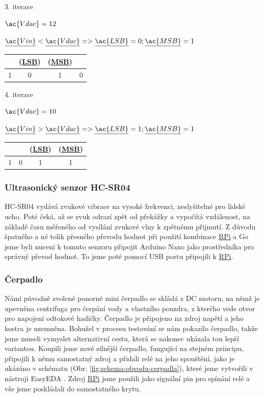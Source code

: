 \documentclass[czech,12pt,a4paper]{article}
\begin{document}
3. iterace

	$\ac{Vdac} = 12$

	$\underline{\ac{Vin}} < \underline{\ac{Vdac}} => \underline{\ac{LSB}} = 0; \underline{\ac{MSB}} = 1$

\begin{center}
	\begin{tabular}{ |c|c|c|c| } 
		\hline
		& (\underline{\ac{LSB}}) & (\underline{\ac{MSB}}) & \\ 
		\hline
		1 & 0 & 1 & 0 \\ 
		\hline
	\end{tabular}
\end{center}

4. iterace

$\ac{Vdac} = 10$

	$\underline{\ac{Vin}} > \underline{\ac{Vdac}} => \underline{\ac{LSB}} = 1; \underline{\ac{MSB}} = 1$

\begin{center}
	\begin{tabular}{ |c|c|c|c| } 
		\hline
		& & (\underline{\ac{LSB}}) & (\underline{\ac{MSB}}) \\ 
		\hline
		1 & 0 & 1 & 1 \\ 
		\hline
	\end{tabular}
\end{center}

\subsubsection{Ultrasonický senzor HC-SR04} \label{secSonic}

\ac{HC-SR04} vydává zvukové vibrace na vysoké frekvenci, neslyšitelné pro lidské ucho. Poté čeká, až se zvuk odrazí zpět od překážky a vypočítá vzdálenost, na základě času měřeného od vysílání zvukové vlny k zpětnému přijmutí. Z důvodu špatného a né tolik přesného převodu hodnot při použití kombinace \underline{\ac{RPi}} a Go jsme byli nuceni k tomuto senzoru připojit Arduino Nano jako prostředníka pro správný převod hodnot. To jsme poté pomocí USB portu připojili k \underline{\ac{RPi}}.

\subsubsection{Čerpadlo}

Námi původně zvolené ponorné mini čerpadlo se skládá z DC motoru, na němž je upevněna centrifuga pro čerpání vody a vlastního pouzdra, z kterého vede otvor pro napojení odtokové hadičky. Čerpadlo je připojeno na zdroj napětí a jeho kostra je uzemněna. Bohužel v procesu testování se nám pokazilo čerpadlo, takže jsme museli vymyslet alternativní cestu, která se nakonec ukázala tou lepší variantou. Koupili jsme nové silnější čerpadlo, fungující na stejném principu, připojili k němu samostatný zdroj a přidali relé na jeho spouštění, jako je ukázáno v schématu (Obr. \ref{fig:schema-obvodu-cerpadla}), které jsme vytvořili v nástroji EasyEDA \cite{easyeda}. Zdroj \underline{\ac{RPi}} jsme použili jako signální pin pro spínání relé a vše jsme poskládali do samostatného krytu.
\end{document}
